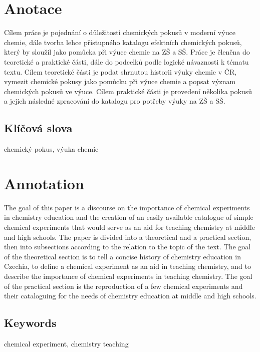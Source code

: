 \documentclass{template/socthesis}
\author{Jan Romanovský}
\begin{document}
	\maketitle


	\pagestyle{empty}

	\section*{Anotace}
	Cílem práce je pojednání o důležitosti chemických pokusů v moderní výuce chemie, dále tvorba lehce přístupného katalogu efektních chemických pokusů, který by sloužil jako pomůcka při výuce chemie na ZŠ a SŠ. Práce je členěna do teoretické a praktické části, dále do podcelků podle logické návaznosti k tématu textu.
	Cílem teoretické části je podat shrnutou historii výuky chemie v ČR, vymezit chemické pokusy jako pomůcku při výuce chemie a popsat význam chemických pokusů ve výuce.
	Cílem praktické části je provedení několika pokusů a jejich následné zpracování do katalogu pro potřeby výuky na ZŠ a SŠ.

	\subsection*{Klíčová slova}
	chemický pokus, výuka chemie

	\vspace{20mm}

	\section*{Annotation}
	The goal of this paper is a discourse on the importance of chemical experiments in chemistry education and the creation of an easily available catalogue of simple chemical experiments that would serve as an aid for teaching chemistry at middle and high schools. The paper is divided into a theoretical and a practical section, then into subsections according to the relation to the topic of the text.
	The goal of the theoretical section is to tell a concise history of chemistry education in Czechia, to define a chemical experiment as an aid in teaching chemistry, and to describe the importance of chemical experiments in teaching chemistry.
	The goal of the practical section is the reproduction of a few chemical experiments and their cataloguing for the needs of chemistry education at middle and high schools.

	\subsection*{Keywords}
	chemical experiment, chemistry teaching
\end{document}
